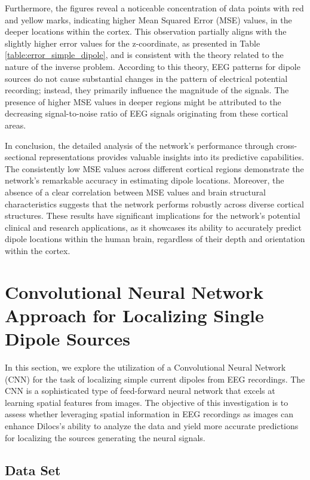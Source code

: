 \documentclass[a4paper, UKenglish, 11pt]{uiomaster}
\begin{document}
Furthermore, the figures reveal a noticeable concentration of data points with red and yellow marks, indicating higher Mean Squared Error (MSE) values, in the deeper locations within the cortex. This observation partially aligns with the slightly higher error values for the z-coordinate, as presented in Table \ref{table:error_simple_dipole}, and is consistent with the theory related to the nature of the inverse problem. According to this theory, EEG patterns for dipole sources do not cause substantial changes in the pattern of electrical potential recording; instead, they primarily influence the magnitude of the signals. The presence of higher MSE values in deeper regions might be attributed to the decreasing signal-to-noise ratio of EEG signals originating from these cortical areas.

In conclusion, the detailed analysis of the network's performance through cross-sectional representations provides valuable insights into its predictive capabilities. The consistently low MSE values across different cortical regions demonstrate the network's remarkable accuracy in estimating dipole locations. Moreover, the absence of a clear correlation between MSE values and brain structural characteristics suggests that the network performs robustly across diverse cortical structures. These results have significant implications for the network's potential clinical and research applications, as it showcases its ability to accurately predict dipole locations within the human brain, regardless of their depth and orientation within the cortex.


\newpage

\section{Convolutional Neural Network Approach for Localizing Single Dipole Sources}

In this section, we explore the utilization of a Convolutional Neural Network (CNN) for the task of localizing simple current dipoles from EEG recordings. The CNN is a sophisticated type of feed-forward neural network that excels at learning spatial features from images. The objective of this investigation is to assess whether leveraging spatial information in EEG recordings as images can enhance Dilocs's ability to analyze the data and yield more accurate predictions for localizing the sources generating the neural signals.

\subsection{Data Set}
\end{document}
